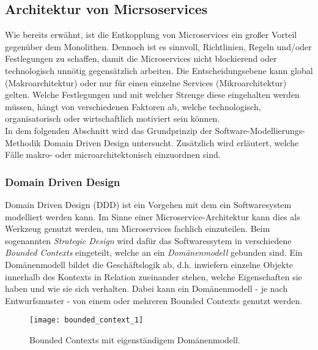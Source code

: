 \subsection{Architektur von Micrsoservices}

Wie bereits erwähnt, ist die Entkopplung von Microservices ein großer Vorteil gegenüber dem Monolithen. Dennoch ist es sinnvoll, Richtlinien, Regeln und/oder Festlegungen zu schaffen, damit die Microservices nicht blockierend oder technologisch unnötig gegensätzlich arbeiten. Die Entscheidungsebene kann global (Makroarchitektur) oder nur für einen einzelne Services (Mikroarchitektur) gelten.\cite{wolff2016mic_architectures} Welche Festlegungen und mit welcher Strenge diese eingehalten werden müssen, hängt von verschiedenen Faktoren ab, welche technologisch, organisatorisch oder wirtschaftlich motiviert sein können.\cite{rewe2019mic_ppp} \\ 

In dem folgenden Abschnitt wird das Grundprinzip der Software-Modellierungs-Methodik Domain Driven Design untersucht. Zusätzlich wird erläutert, welche Fälle makro- oder microarchitektonisch einzuordnen sind. \\

\subsubsection{Domain Driven Design}\label{sec:domain_driven_design}

Domain Driven Design (DDD) ist ein Vorgehen mit dem ein Softwaresystem modelliert werden kann. Im Sinne einer Microservice-Architektur kann dies als Werkzeug genutzt werden, um Microservices fachlich einzuteilen.\cite{heise2016ddd} Beim sogenannten \textit{Strategic Design} wird dafür das Softwaressytem in verschiedene \textit{Bounded Contexts} eingeteilt, welche an ein \textit{Domänenmodell} gebunden sind. Ein Domänenmodell bildet die Geschäftslogik ab, d.h. inwiefern einzelne Objekte innerhalb des Kontexts in Relation zueinander stehen, welche Eigenschaften sie haben und wie sie sich verhalten. Dabei kann ein Domänenmodell - je nach Entwurfsmuster - von einem oder mehreren Bounded Contexts genutzt werden.\cite{wolff2018mic_praxis}  \\

\begin{figure}[ht]
	\centering
	\texttt{[image: bounded\_context\_1]}
	\caption[Bounded Contexts mit eigenständigem Domänenmodel] {Bounded Contexts mit eigenständigem Domänenmodell.\cite{wolff2018mic_praxis}}
	\label{fig:bounded_context_with_own_datamodels}
\end{figure}

